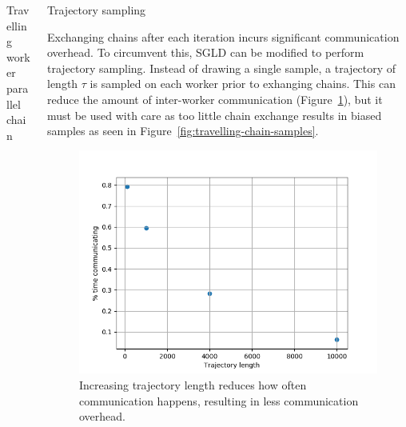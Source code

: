 \documentclass[final]{beamer}
\newlength{\onecolwid}
\newlength{\twocolwid}
\begin{document}
\begin{frame}[t]
\begin{columns}[t]
\begin{column}{\twocolwid}
\begin{columns}[t,totalwidth=\twocolwid]
\begin{column}{\onecolwid}
\begin{block}{Travelling worker parallel chain}
\end{block}


\end{column} %

\begin{column}{\onecolwid}\vspace{-.6in} %


\begin{block}{Trajectory sampling}

  Exchanging chains after each iteration incurs significant communication overhead.
  To circumvent this, SGLD can be modified to perform trajectory sampling.
  Instead of drawing a single sample, a trajectory of length $\tau$ is sampled
  on each worker prior to exhanging chains. This can reduce the amount of inter-worker
  communication (Figure~\ref{fig:less-comm}), but it must be used with care as too little
  chain exchange results in biased samples as seen in Figure~\ref{fig:travelling-chain-samples}.

  \begin{figure}
    \includegraphics[width=0.99\linewidth]{poster-figures/traj_length_slowdown.png}
    \caption{Increasing trajectory length reduces how often communication happens, resulting in less
      communication overhead.}
    \label{fig:less-comm}
  \end{figure}
\end{block}


\end{column}
\end{columns}
\end{column}
\end{columns}
\end{frame}
\end{document}
